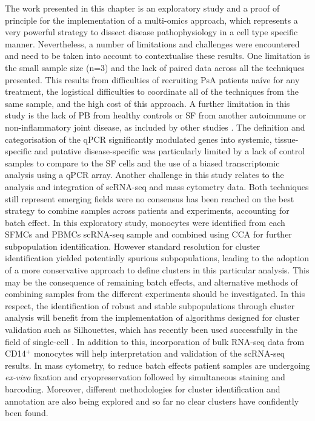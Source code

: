 The work presented in this chapter is an exploratory study and a proof of principle for the implementation of a multi-omics approach, which represents a very powerful strategy to dissect disease pathophysiology in a cell type specific manner. Nevertheless, a number of limitations and challenges were encountered and need to be taken into account to contextualise these results. One limitation is the small sample size (n=3) and the lack of paired data across all the techniques presented. This results from difficulties of recruiting PsA patients na\'{i}ve for any treatment, the logistical difficulties to coordinate all of the techniques from the same sample, and the high cost of this approach. A further limitation in this study is the lack of PB from healthy controls or SF from another autoimmune or non-inflammatory joint disease, as included by other studies \parencite{Fumitaka2018, Dolcino2015,Zhang2018}.  The definition and categorisation of the qPCR significantly modulated genes into systemic, tissue-specific and putative disease-specific was particularly limited by a lack of control samples to compare to the SF cells and the use of a biased transcriptomic analysis using a qPCR array.
Another challenge in this study relates to the analysis and integration of scRNA-seq and mass cytometry data. Both techniques still represent emerging fields were no consensus has been reached on the best strategy to combine samples across patients and experiments, accounting for batch effect. In this exploratory study, monocytes were identified from each SFMCs and PBMCs scRNA-seq sample and combined using CCA for further subpopulation identification. However standard resolution for cluster identification yielded potentially spurious subpopulations, leading to the adoption of a more conservative approach to define clusters in this particular analysis. This may be the consequence of remaining batch effects, and alternative methods of combining samples from the different experiments should be investigated. In this respect, the identification of robust and stable subpopulations through cluster analysis will benefit from the implementation of algorithms designed for cluster validation such as Silhouettes, which has recently been used successfully in the field of single-cell \parencite{Rousseeuw1987, Zhang2018}. In addition to this, incorporation of bulk RNA-seq data from CD14$^+$ monocytes will help interpretation and validation of the scRNA-seq results. In mass cytometry, to reduce batch effects patient samples are undergoing \textit{ex-vivo} fixation and cryopreservation followed by simultaneous staining and barcoding. Moreover, different methodologies for cluster identification and annotation are also being explored and so far no clear clusters have confidently been found.

